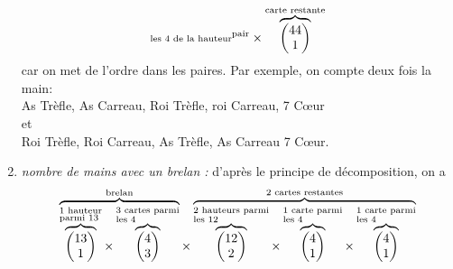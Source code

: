 \documentclass{book}
\begin{document}
\begin{Exercice}[Poker]
\begin{Correction}
\begin{enumerate}
$${{\begin{subarray}{l}
    \text{les 4 de la hauteur}\end{subarray}}}^{\text{pair}}
    \times     \overbrace{\begin{pmatrix}44\\1\end{pmatrix}}^{\text{carte restante}}$$
car on met de l'ordre  dans les paires. Par exemple, on compte deux fois la main:\\
 As Trèfle, As Carreau, Roi Trèfle, roi Carreau, 7 C\oe ur\\ et\\
  Roi Trèfle, Roi Carreau, As Trèfle, As Carreau 7 C\oe ur.  
\item  \textit{nombre de mains avec un brelan :}
 d'après le principe de décomposition,  on a  
$$\overbrace{
\overbrace{\begin{pmatrix}13\\1\end{pmatrix}}^
{\begin{subarray}{l}\text{1 hauteur}\\
    \text{parmi 13}\end{subarray}}
\times    \overbrace{\begin{pmatrix}4\\3\end{pmatrix}}^{\begin{subarray}{l}\text{3 cartes parmi}\\
    \text{les 4}\end{subarray}}}^{\text{brelan}}
\times \overbrace{   \overbrace{\begin{pmatrix}12\\2\end{pmatrix}}^{\begin{subarray}{l}\text{2 hauteurs parmi}\\
    \text{les 12}\end{subarray}}
\times    \overbrace{\begin{pmatrix}4\\1\end{pmatrix}}^{\begin{subarray}{l}\text{1 carte parmi}\\
    \text{les 4}\end{subarray}}
\times    \overbrace{\begin{pmatrix}4\\1\end{pmatrix}}^{\begin{subarray}{l}\text{1 carte parmi}\\
    \text{les 4}\end{subarray}}}^{\text{2 cartes restantes}}
$$
\end{enumerate}
\end{Correction}
\end{Exercice}
\end{document}
